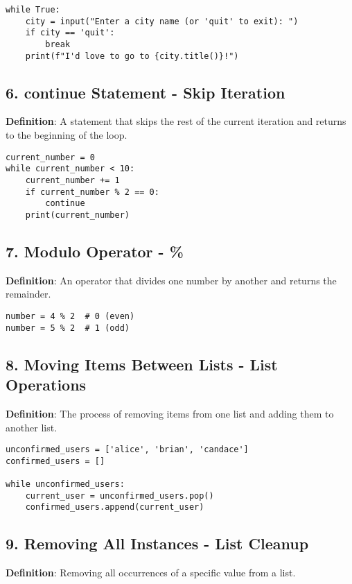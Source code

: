 \begin{lstlisting}
while True:
    city = input("Enter a city name (or 'quit' to exit): ")
    if city == 'quit':
        break
    print(f"I'd love to go to {city.title()}!")
\end{lstlisting}

\subsection*{6. continue Statement - Skip Iteration}
\textbf{Definition}: A statement that skips the rest of the current iteration and returns to the beginning of the loop.

\begin{lstlisting}
current_number = 0
while current_number < 10:
    current_number += 1
    if current_number % 2 == 0:
        continue
    print(current_number)
\end{lstlisting}

\subsection*{7. Modulo Operator - \%}
\textbf{Definition}: An operator that divides one number by another and returns the remainder.

\begin{lstlisting}
number = 4 % 2  # 0 (even)
number = 5 % 2  # 1 (odd)
\end{lstlisting}

\subsection*{8. Moving Items Between Lists - List Operations}
\textbf{Definition}: The process of removing items from one list and adding them to another list.

\begin{lstlisting}
unconfirmed_users = ['alice', 'brian', 'candace']
confirmed_users = []

while unconfirmed_users:
    current_user = unconfirmed_users.pop()
    confirmed_users.append(current_user)
\end{lstlisting}

\subsection*{9. Removing All Instances - List Cleanup}
\textbf{Definition}: Removing all occurrences of a specific value from a list.

